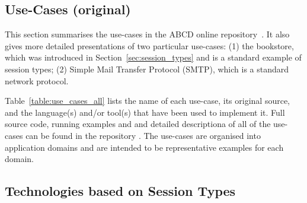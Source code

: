 
\subsection{Use-Cases (original)}
\label{sec:usecases}

This section summarises the use-cases in
the ABCD online repository~\cite{usecase_repository}. It also gives more detailed presentations of two particular use-cases: (1) the bookstore, which was introduced in Section~\ref{sec:session_types} and is a standard example of session types; (2) Simple Mail Transfer Protocol (SMTP), which is a standard network protocol.



Table~\ref{table:use_cases_all} lists the name of each use-case, its original source, and the language(s) and/or tool(s) that have been used to implement it. Full source code,
running examples and and detailed descriptiona of all of the use-cases can be found in the repository \cite{usecase_repository}.
The use-cases are organised into application domains and are intended to be representative examples for each domain.

\subsection{Technologies based on Session Types}


